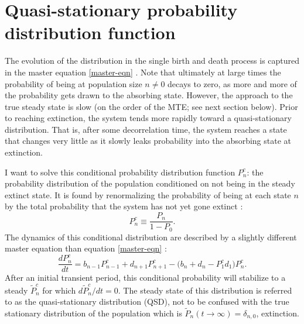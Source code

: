 \section{Quasi-stationary probability distribution function}%

The evolution of the distribution in the single birth and death process is captured in the master equation \ref{master-eqn} \cite{Nisbet1982,Gardiner2004}. 
Note that ultimately at large times the probability of being at population size $n\neq 0$ decays to zero, as more and more of the probability gets drawn to the absorbing state. 
However, the approach to the true steady state is slow (on the order of the MTE; see next section below). 
Prior to reaching extinction, the system tends more rapidly toward a quasi-stationary distribution. 
That is, after some decorrelation time, the system reaches a state that changes very little as it slowly leaks probability into the absorbing state at extinction. 

I want to solve this conditional probability distribution function $P_n^c$: the probability distribution of the population conditioned on not being in the steady extinct state. 
It is found by renormalizing the probability of being at each state $n$ by the total probability that the system has not yet gone extinct \cite{Nisbet1982}:
\begin{equation}
 P_n^c \equiv \frac{P_n}{1-P_0}.
\end{equation}
The dynamics of this conditional distribution are described by a slightly different master equation than equation \ref{master-eqn} \cite{Nisbet1982}:
\begin{equation}
\frac{dP_n^c}{dt} =  b_{n-1}P_{n-1}^c + d_{n+1}P_{n+1}^c - \big(b_n + d_n - P_1^c d_1 \big) P_n^c. 
 \label{masters2}
\end{equation}
After an initial transient period, this conditional probability will stabilize to a steady $\tilde{P}^c_n$ for which $d\tilde{P}_n^c/dt=0$. 
The steady state of this distribution is referred to as the quasi-stationary distribution (QSD), not to be confused with the true stationary distribution of the population which is $\tilde{P}_n(t\rightarrow\infty)=\delta_{n,0}$, extinction. 

